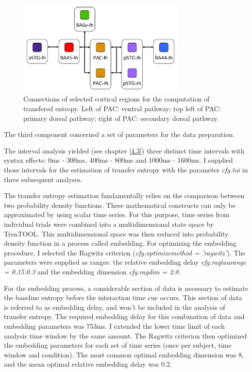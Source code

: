 \begin{figure}[h]
\begin{center}
\vspace{7mm}
\includegraphics[width=0.75\textwidth]{pics/3_4_regions.png}
\caption{\label{3.4.regions} Connections of selected cortical regions for the computation of transfered entropy. Left of PAC: ventral pathway; top left of PAC: primary dorsal pathway; right of PAC: secondary dorsal pathway.}
\end{center}
\end{figure}

The third component concerned a set of parameters for the data preparation.

The interval analysis yielded (see chapter \ref{4.3}) three distinct time intervals with syntax effects: 0ms - 300ms, 400ms - 800ms and 1000ms - 1600ms.
I supplied those intervals for the estimation of transfer entropy with the parameter \emph{cfg.toi} in three subsequent analyses.

The transfer entropy estimation fundamentally relies on the comparison between two probability density functions.
These mathematical constructs can only be approximated by using scalar time series.
For this purpose, time series from individual trials were combined into a multidimensional state space by TrenTOOL.
This multidimensional space was then reduced into probability density function in a process called embedding.
For optimizing the embedding procedure, I selected the Ragwitz criterion (\emph{cfg.optimizemethod = 'ragwitz'}).
The parameters were supplied as ranges: the relative embedding delay \emph{cfg.ragtaurange = 0.15:0.3} and the embedding dimension \emph{cfg.ragdim = 2:8}.

For the embedding process, a considerable section of data is necessary to estimate the baseline entropy before the interaction time cue occurs.
This section of data is referred to as embedding delay, and won't be included in the analysis of transfer entropy.
The required embedding delay for this combination of data and embedding parameters was 753ms.
I extended the lower time limit of each analysis time window by the same amount.
The Ragwitz criterion then optimized the embedding parameters for each set of time series (once per subject, time window and condition).
The most common optimal embedding dimension was 8, and the mean optimal relative embedding delay was 0.2.

